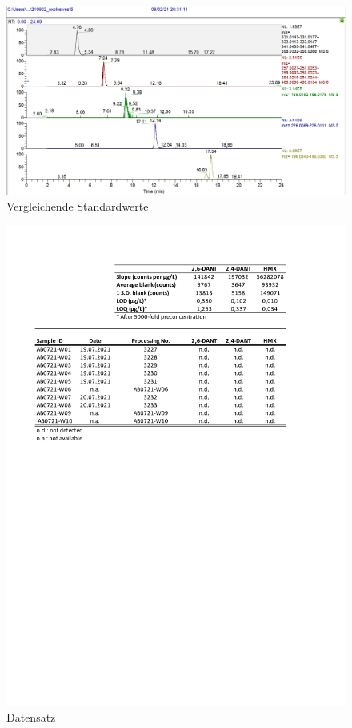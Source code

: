 \begin{figure}[htb]
\includegraphics[height=\textheight,%
                   width=\textwidth,%
                   keepaspectratio]{Bilder/Explosives_5ppb.PNG}
\caption{Vergleichende Standardwerte}
\end{figure}
\begin{figure}[htb]
\includegraphics[height=\textheight,%
                   width=\textwidth,%
                   keepaspectratio]{Bilder/MC_data_Aldebaran.pdf}
\caption{Datensatz}
\end{figure}
